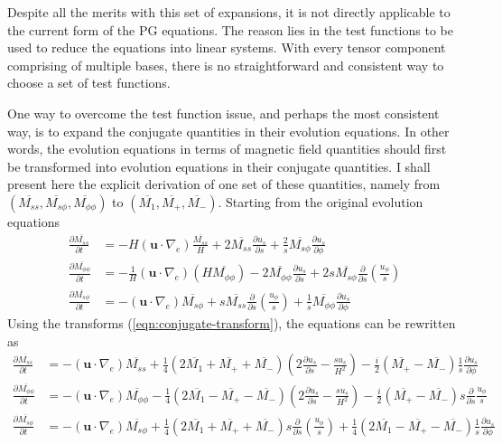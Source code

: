 Despite all the merits with this set of expansions, it is not directly applicable to the current form of the PG equations. 
The reason lies in the test functions to be used to reduce the equations into linear systems.
With every tensor component comprising of multiple bases, there is no straightforward and consistent way to choose a set of test functions.

One way to overcome the test function issue, and perhaps the most consistent way, is to expand the conjugate quantities in their evolution equations.
In other words, the evolution equations in terms of magnetic field quantities should first be transformed into evolution equations in their conjugate quantities.
I shall present here the explicit derivation of one set of these quantities, namely from $(\overline{M_{ss}}, \overline{M_{s\phi}}, \overline{M_{\phi\phi}})$ to $(\overline{M_1}, \overline{M_+}, \overline{M_-})$.
Starting from the original evolution equations
\[\begin{aligned}
    \frac{\partial \overline{M_{ss}}}{\partial t} &= -H (\mathbf{u}\cdot \nabla_e) \frac{\overline{M_{ss}}}{H} + 2 \overline{M_{ss}} \frac{\partial u_s}{\partial s} + \frac{2}{s} \overline{M_{s\phi}} \frac{\partial u_s}{\partial \phi} \\ 
    \frac{\partial \overline{M_{\phi\phi}}}{\partial t} &= -\frac{1}{H} (\mathbf{u}\cdot \nabla_e) \left(H \overline{M_{\phi\phi}}\right) - 2 \overline{M_{\phi\phi}} \frac{\partial u_s}{\partial s} + 2 s \overline{M_{s\phi}} \frac{\partial}{\partial s}\left(\frac{u_\phi}{s}\right) \\ 
    \frac{\partial \overline{M_{s\phi}}}{\partial t} &= - (\mathbf{u}\cdot \nabla_e) \overline{M_{s\phi}} + s \overline{M_{ss}} \frac{\partial}{\partial s}\left(\frac{u_\phi}{s}\right) + \frac{1}{s} \overline{M_{\phi\phi}} \frac{\partial u_s}{\partial \phi}
\end{aligned}\]
Using the transforms (\ref{eqn:conjugate-transform}), the equations can be rewritten as
\[\begin{aligned}
    \frac{\partial \overline{M_{ss}}}{\partial t} &= - (\mathbf{u}\cdot \nabla_e) \overline{M_{ss}} + \frac{1}{4}\left(2\overline{M_1} + \overline{M_+} + \overline{M_-}\right) \left(2 \frac{\partial u_s}{\partial s} - \frac{su_s}{H^2}\right) - \frac{i}{2} \left(\overline{M_+} - \overline{M_-}\right) \frac{1}{s} \frac{\partial u_s}{\partial \phi} \\ 
    \frac{\partial \overline{M_{\phi\phi}}}{\partial t} &= - (\mathbf{u}\cdot \nabla_e) \overline{M_{\phi\phi}} - \frac{1}{4}\left(2\overline{M_1} - \overline{M_+} - \overline{M_-}\right) \left(2 \frac{\partial u_s}{\partial s} - \frac{su_s}{H^2}\right) - \frac{i}{2} \left(\overline{M_+} - \overline{M_-}\right) s \frac{\partial}{\partial s} \frac{u_\phi}{s} \\ 
    \frac{\partial \overline{M_{s\phi}}}{\partial t} &= - (\mathbf{u}\cdot \nabla_e) \overline{M_{s\phi}} + \frac{1}{4}\left(2\overline{M_1} + \overline{M_+} + \overline{M_-}\right) s \frac{\partial}{\partial s}\left(\frac{u_\phi}{s}\right) + \frac{1}{4}\left(2\overline{M_1} - \overline{M_+} - \overline{M_-}\right) \frac{1}{s} \frac{\partial u_s}{\partial \phi}
\end{aligned}\]
